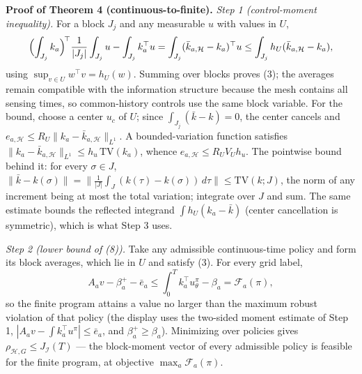 \documentclass[10pt,article]{article}
\begin{document}
\textbf{Proof of Theorem 4 (continuous-to-finite).}
\emph{Step 1 (control-moment inequality).} For a block \(J_j\) and any
measurable \(u\) with values in \(U\),
\[
\Bigl(\int_{J_j} k_a\Bigr)^{\!\top} \frac{1}{|J_j|}\int_{J_j} u
- \int_{J_j} k_a^\top u
= \int_{J_j} (\bar k_{a,\mathcal H} - k_a)^\top u
\le \int_{J_j} h_U(\bar k_{a,\mathcal H} - k_a),
\]
using \(\sup_{v \in U} w^\top v = h_U(w)\). Summing over blocks proves (3);
the averages remain compatible with the information structure because the
mesh contains all sensing times, so common-history controls use the same
block variable. For the bound, choose a center \(u_c\) of \(U\); since
\(\int_{J_j}(\bar k - k) = 0\), the center cancels and
\(e_{a,\mathcal H} \le R_U \|k_a - \bar k_{a,\mathcal H}\|_{L^1}\). A
bounded-variation function satisfies \(\|k_a - \bar k_{a,\mathcal
H}\|_{L^1} \le h_u\, \mathrm{TV}(k_a)\), whence \(e_{a,\mathcal H} \le R_U
V_U h_u\). The pointwise bound behind it: for every \(\sigma \in J\),
\(\|\bar k - k(\sigma)\| = \bigl\|\tfrac{1}{|J|}\int_J (k(\tau) -
k(\sigma))\,d\tau\bigr\| \le \mathrm{TV}(k; J)\), the norm of any
increment being at most the total variation; integrate over \(J\) and
sum. The same estimate bounds the reflected integrand
\(\int h_U(k_a - \bar k)\) (center cancellation is symmetric), which
is what Step 3 uses.

\emph{Step 2 (lower bound of (8)).} Take any admissible continuous-time
policy and form its block averages, which lie in \(U\) and satisfy (3). For
every grid label,
\[
A_a v - \beta_a^{+} - \bar e_a \le \int_0^T k_a^\top u^\pi_\theta -
\beta_a = \mathcal F_a(\pi),
\]
so the finite program attains a value no larger than the maximum robust
violation of that policy (the display uses the two-sided moment estimate
of Step 1, \(|A_a v - \int k_a^\top u^\pi| \le \bar e_a\), and
\(\beta_a^{+} \ge \beta_a\)). Minimizing over policies gives
\(\rho_{\mathcal H,G} \le J_{\mathcal I}(T)\) --- the block-moment
vector of every admissible policy is feasible for the finite program, at
objective \(\max_a \mathcal F_a(\pi)\).
\end{document}
